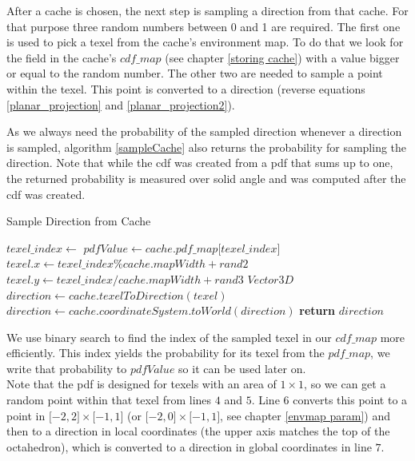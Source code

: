 After a cache is chosen, the next step is sampling a direction from that cache. For that purpose three random numbers between 0 and 1 are required. The first one is used to pick a texel from the cache's environment map. To do that we look for the field in the cache's $cdf\_map$ (see chapter \ref{storing cache}) with a value bigger or equal to the random number. The other two are needed to sample a point within the texel. This point is converted to a direction (reverse equations \ref{planar_projection} and \ref{planar_projection2}).

As we always need the probability of the sampled direction whenever a direction is sampled, algorithm \ref{sampleCache} also returns the probability for sampling the direction. Note that while the cdf was created from a pdf that sums up to one, the returned probability is measured over solid angle and was computed after the cdf was created.\newpage


\begin{algorithm}
\caption{Sample Direction from Cache}\label{sampleCache}
\begin{algorithmic}[1]
\State $texel\_index \gets $ 
\State $pdfValue \gets cache.pdf\_map\lbrack texel\_index\rbrack$
\State $texel.x \gets texel\_index \% cache.mapWidth + rand2$
\State $texel.y \gets texel\_index / cache.mapWidth + rand3$
\State $Vector3D$ $direction \gets cache.texelToDirection(texel)$
\State $direction \gets cache.coordinateSystem.toWorld(direction)$
\State \textbf{return} $direction$
\EndProcedure
\end{algorithmic}
\end{algorithm}


We use binary search to find the index of the sampled texel in our $cdf\_map$ more efficiently. This index yields the probability for its texel from the $pdf\_map$, we write that probability to $pdfValue$ so it can be used later on. \\
Note that the pdf is designed for texels with an area of $1\times 1$, so we can get a random point within that texel from lines $4$ and $5$. Line $6$ converts this point to a point in $\lbrack -2,2\rbrack \times \lbrack -1,1\rbrack$ (or $\lbrack -2,0 \rbrack \times \lbrack -1,1\rbrack$, see chapter \ref{envmap param}) and then to a direction in local coordinates (the upper axis matches the top of the octahedron), which is converted to a direction in global coordinates in line $7$.


